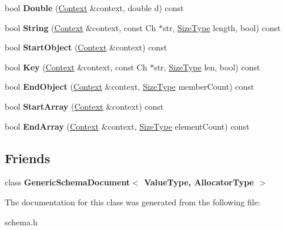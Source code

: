 \begin{DoxyCompactItemize}
\item 
bool {\bfseries Double} (\hyperlink{a00263}{Context} \&context, double d) const \hypertarget{a00261_aaf4ff1cb84013ff1a82ecb59cac38bfe}{}\label{a00261_aaf4ff1cb84013ff1a82ecb59cac38bfe}

\item 
bool {\bfseries String} (\hyperlink{a00263}{Context} \&context, const Ch $\ast$str, \hyperlink{a00677_a5ed6e6e67250fadbd041127e6386dcb5}{Size\+Type} length, bool) const \hypertarget{a00261_a2bc7b83a75b84c241e733be9d356a2c4}{}\label{a00261_a2bc7b83a75b84c241e733be9d356a2c4}

\item 
bool {\bfseries Start\+Object} (\hyperlink{a00263}{Context} \&context) const \hypertarget{a00261_a907b715d5f817d337a3e18759f3ac0e4}{}\label{a00261_a907b715d5f817d337a3e18759f3ac0e4}

\item 
bool {\bfseries Key} (\hyperlink{a00263}{Context} \&context, const Ch $\ast$str, \hyperlink{a00677_a5ed6e6e67250fadbd041127e6386dcb5}{Size\+Type} len, bool) const \hypertarget{a00261_af0855cd2ee33929513dd8b148bfa9017}{}\label{a00261_af0855cd2ee33929513dd8b148bfa9017}

\item 
bool {\bfseries End\+Object} (\hyperlink{a00263}{Context} \&context, \hyperlink{a00677_a5ed6e6e67250fadbd041127e6386dcb5}{Size\+Type} member\+Count) const \hypertarget{a00261_ac66720d141d8c811cb2c71da05509618}{}\label{a00261_ac66720d141d8c811cb2c71da05509618}

\item 
bool {\bfseries Start\+Array} (\hyperlink{a00263}{Context} \&context) const \hypertarget{a00261_a6340166b92577ce0ef9b7735f66937ec}{}\label{a00261_a6340166b92577ce0ef9b7735f66937ec}

\item 
bool {\bfseries End\+Array} (\hyperlink{a00263}{Context} \&context, \hyperlink{a00677_a5ed6e6e67250fadbd041127e6386dcb5}{Size\+Type} element\+Count) const \hypertarget{a00261_a58101f966bd7e51086d456b3d84653eb}{}\label{a00261_a58101f966bd7e51086d456b3d84653eb}

\end{DoxyCompactItemize}
\subsection*{Friends}
\begin{DoxyCompactItemize}
\item 
class {\bfseries Generic\+Schema\+Document$<$ Value\+Type, Allocator\+Type $>$}\hypertarget{a00261_a04f1d1acd0a5a7fda069c115970d52b3}{}\label{a00261_a04f1d1acd0a5a7fda069c115970d52b3}

\end{DoxyCompactItemize}


The documentation for this class was generated from the following file\+:\begin{DoxyCompactItemize}
\item 
schema.\+h\end{DoxyCompactItemize}
